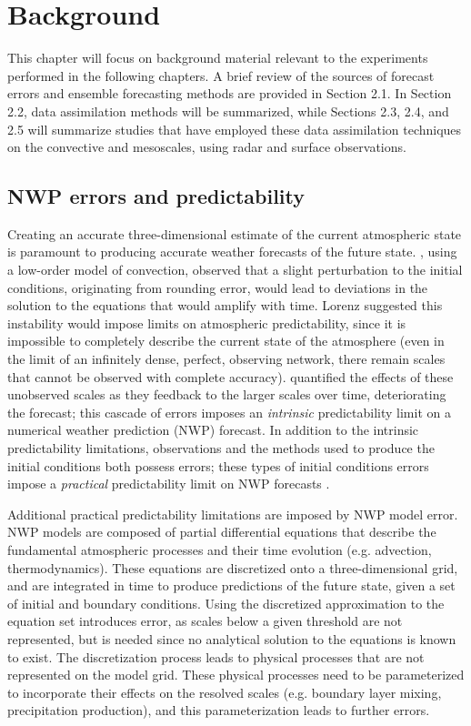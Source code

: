 \chapter{Background}

This chapter will focus on background material relevant to the experiments performed in the following chapters. A brief review of the sources of forecast errors and ensemble forecasting methods are provided in Section 2.1. In Section 2.2, data assimilation methods will be summarized, while Sections 2.3, 2.4, and 2.5 will summarize studies that have employed these data assimilation techniques on the convective and mesoscales, using radar and surface observations. 

\section{NWP errors and predictability}
Creating an accurate three-dimensional estimate of the current atmospheric state is paramount to producing accurate weather forecasts of the future state. \citet{lorenz63}, using a low-order model of convection, observed that a slight perturbation to the initial conditions, originating from rounding error, would lead to deviations in the solution to the equations that would amplify with time. Lorenz suggested this instability would impose limits on atmospheric predictability, since it is impossible to completely describe the current state of the atmosphere (even in the limit of an infinitely dense, perfect, observing network, there remain scales that cannot be observed with complete accuracy). \citep{lorenz69} quantified the effects of these unobserved scales as they feedback to the larger scales over time, deteriorating the forecast; this cascade of errors imposes an {\it intrinsic} predictability limit on a numerical weather prediction (NWP) forecast. In addition to the intrinsic predictability limitations, observations and the methods used to produce the initial conditions both possess errors; these types of initial conditions errors impose a {\it practical} predictability limit on NWP forecasts \cite{melhauserzhang12}.

Additional practical predictability limitations are imposed by NWP model error. NWP models are composed of partial differential equations that describe the fundamental atmospheric processes and their time evolution (e.g. advection, thermodynamics). These equations are discretized onto a three-dimensional grid, and are integrated in time to produce predictions of the future state, given a set of initial and boundary conditions. Using the discretized approximation to the equation set introduces error, as scales below a given threshold are not represented, but is needed since no analytical solution to the equations is known to exist. The discretization process leads to physical processes that are not represented on the model grid. These physical processes need to be parameterized to incorporate their effects on the resolved scales (e.g. boundary layer mixing, precipitation production), and this parameterization leads to further errors.

